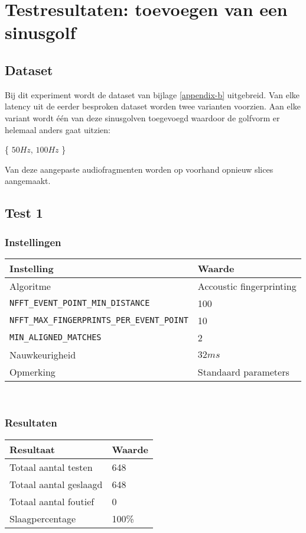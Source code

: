 \chapter{Testresultaten: toevoegen van een sinusgolf}
\label{appendix-c}

\section*{Dataset}

Bij dit experiment wordt de dataset van bijlage \ref{appendix-b} uitgebreid. Van elke latency uit de eerder besproken dataset worden twee varianten voorzien. Aan elke variant wordt één van deze sinusgolven toegevoegd waardoor de golfvorm er helemaal anders gaat uitzien:

\begin{center}
	\{ $50Hz$, $100Hz$ \}
\end{center}

Van deze aangepaste audiofragmenten worden op voorhand opnieuw slices aangemaakt. 

\section*{Test 1}

\subsection*{Instellingen}

\begin{tabular}{ l  l}
	\hline
	\textbf{Instelling} & \textbf{Waarde} \\
	\hline
	Algoritme & Accoustic fingerprinting \\
	\texttt{NFFT\_EVENT\_POINT\_MIN\_DISTANCE} & 100 \\
	\texttt{NFFT\_MAX\_FINGERPRINTS\_PER\_EVENT\_POINT} & 10 \\
	\texttt{MIN\_ALIGNED\_MATCHES} & 2 \\
	Nauwkeurigheid & $32ms$ \\
	Opmerking & Standaard parameters \\
\end{tabular}\\

\subsection*{Resultaten}

\begin{tabular}{ l  l}
	\hline
	\textbf{Resultaat} & \textbf{Waarde} \\
	\hline
	Totaal aantal testen & 648 \\
	Totaal aantal geslaagd & 648 \\
	Totaal aantal foutief & 0 \\
	Slaagpercentage & 100\% \\
\end{tabular}\\

